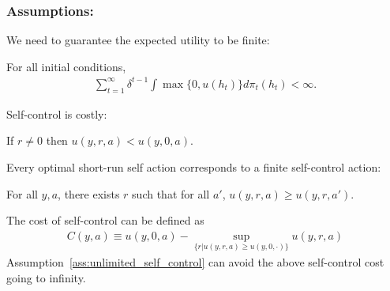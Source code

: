 \documentclass[11pt]{elegantbook}
\begin{document}
\subsubsection*{Assumptions:}
We need to guarantee the expected utility to be finite:
\begin{assumption}
    For all initial conditions,
    \begin{equation}
        \begin{aligned}
            \sum_{t=1}^\infty\delta^{t-1}\int \max\{0,u(h_t)\}d\pi_t(h_t)<\infty.
        \end{aligned}
        \nonumber
    \end{equation}
\end{assumption}
Self-control is costly:
\begin{assumption}
    If $r\neq 0$ then $u(y,r,a)<u(y,0,a)$.
\end{assumption}
Every optimal short-run self action corresponds to a finite self-control action:
\begin{assumption}\label{ass:unlimited_self_control}
    For all $y,a$, there exists $r$ such that for all $a'$, $u(y,r,a)\geq u(y,r,a')$.
\end{assumption}
The cost of self-control can be defined as
\begin{equation}
    \begin{aligned}
        C(y,a)\equiv u(y,0,a)-\sup_{\{r|u(y,r,a)\geq u(y,0,\cdot)\}}u(y,r,a)
    \end{aligned}
    \nonumber
\end{equation}
Assumption~\ref{ass:unlimited_self_control} can avoid the above self-control cost going to infinity.
\end{document}
